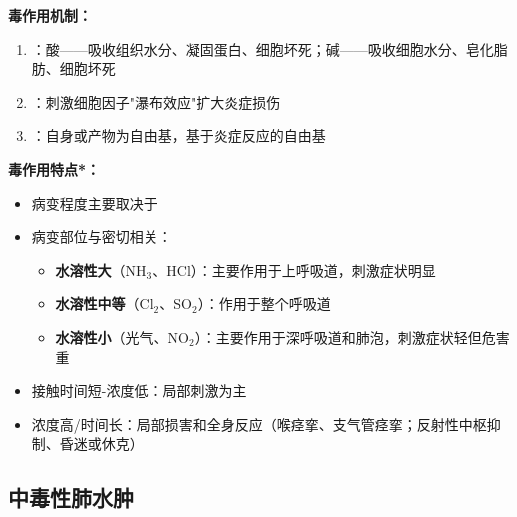 \begin{keybox}
\textbf{毒作用机制：}
\begin{enumerate}[leftmargin=*]
    \item {}：酸——吸收组织水分、凝固蛋白、细胞坏死；碱——吸收细胞水分、皂化脂肪、细胞坏死
    \item {}：刺激细胞因子"瀑布效应"扩大炎症损伤
    \item {}：自身或产物为自由基，基于炎症反应的自由基
\end{enumerate}

\textbf{毒作用特点*：}
\begin{itemize}[leftmargin=*]
    \item 病变程度主要取决于
    \item 病变部位与密切相关：
    \begin{itemize}
        \item \textbf{水溶性大}（NH$_3$、HCl）：主要作用于上呼吸道，刺激症状明显
        \item \textbf{水溶性中等}（Cl$_2$、SO$_2$）：作用于整个呼吸道
        \item \textbf{水溶性小}（光气、NO$_2$）：主要作用于深呼吸道和肺泡，刺激症状轻但危害重
    \end{itemize}
    \item 接触时间短-浓度低：局部刺激为主
    \item 浓度高/时间长：局部损害和全身反应（喉痉挛、支气管痉挛；反射性中枢抑制、昏迷或休克）
\end{itemize}
\end{keybox}

\subsection{中毒性肺水肿}

